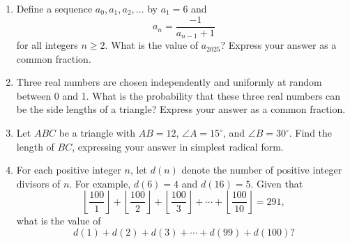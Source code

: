 \documentclass{article}
\begin{document}
\begin{enumerate}
\item Define a sequence $a_0, a_1, a_2, \ldots$ by $a_1 = 6$ and
\begin{equation*}
a_n = \frac{-1}{a_{n - 1} + 1}
\end{equation*}
for all integers $n\geq 2$. What is the value of $a_{2025}$? Express your answer as a common fraction.\vspace{3cm}
\item Three real numbers are chosen independently and uniformly at random between 0 and 1. What is the probability that these three real numbers can be the side lengths of a triangle? Express your answer as a common fraction.\vspace{3cm}
\item Let $ABC$ be a triangle with $AB = 12$, $\angle A = 15^{\circ}$, and $\angle B = 30^{\circ}$. Find the length of $BC$, expressing your answer in simplest radical form.\vspace{3cm}
\item For each positive integer $n$, let $d(n)$ denote the number of positive integer divisors of $n$. For example, $d(6) = 4$ and $d(16) = 5$. Given that
\begin{equation*}
\left\lfloor\frac{100}{1}\right\rfloor + \left\lfloor\frac{100}{2}\right\rfloor + \left\lfloor\frac{100}{3}\right\rfloor + \cdots + \left\lfloor\frac{100}{10}\right\rfloor = 291,
\end{equation*}
what is the value of
\begin{equation*}
d(1) + d(2) + d(3) + \cdots + d(99) + d(100)?
\end{equation*}
\end{enumerate}
\end{document}
